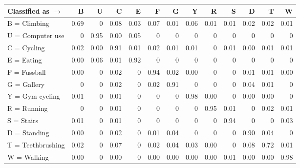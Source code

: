 \begin{tabular}{lrrrrrrrrrrrr}
\toprule
Classified as $\rightarrow$ &    B &    U &    C &    E &    F &    G &    Y &    R &    S &    D &    T &    W \\
\midrule
B = Climbing      & 0.69 &  0 & 0.08 & 0.03 & 0.07 & 0.01 & 0.06 & 0.01 & 0.01 & 0.02 & 0.02 & 0.01 \\
U = Computer use  &  0 & 0.95 & 0.00 & 0.05 &  0 &  0 &  0 &  0 &  0 &  0 &  0 &  0 \\
C = Cycling       & 0.02 & 0.00 & 0.91 & 0.01 & 0.02 & 0.01 & 0.01 &  0 & 0.01 & 0.00 & 0.01 & 0.01 \\
E = Eating        & 0.00 & 0.06 & 0.01 & 0.92 &  0 &  0 &  0 &  0 &  0 &  0 &  0 &  0 \\
F = Fussball      & 0.00 &  0 & 0.02 &  0 & 0.94 & 0.02 & 0.00 &  0 &  0 & 0.01 & 0.01 & 0.00 \\
G = Gallery       &  0 &  0 & 0.02 &  0 & 0.02 & 0.91 &  0 &  0 &  0 & 0.04 & 0.01 &  0 \\
Y = Gym cycling   & 0.01 &  0 & 0.01 &  0 &  0 &  0 & 0.98 & 0.00 &  0 & 0.00 & 0.00 &  0 \\
R = Running       &  0 &  0 & 0.01 &  0 &  0 &  0 &  0 & 0.95 & 0.01 &  0 & 0.02 & 0.01 \\
S = Stairs        & 0.01 &  0 & 0.01 &  0 &  0 &  0 &  0 &  0 & 0.94 &  0 &  0 & 0.03 \\
D = Standing      & 0.00 &  0 & 0.02 &  0 & 0.01 & 0.04 &  0 &  0 &  0 & 0.90 & 0.04 &  0 \\
T = Teethbrushing & 0.02 &  0 & 0.07 &  0 & 0.02 & 0.04 & 0.03 & 0.00 &  0 & 0.08 & 0.72 & 0.01 \\
W = Walking       & 0.00 &  0 & 0.00 &  0 & 0.00 & 0.00 & 0.00 & 0.00 & 0.01 & 0.00 & 0.00 & 0.98 \\
\bottomrule
\end{tabular}
